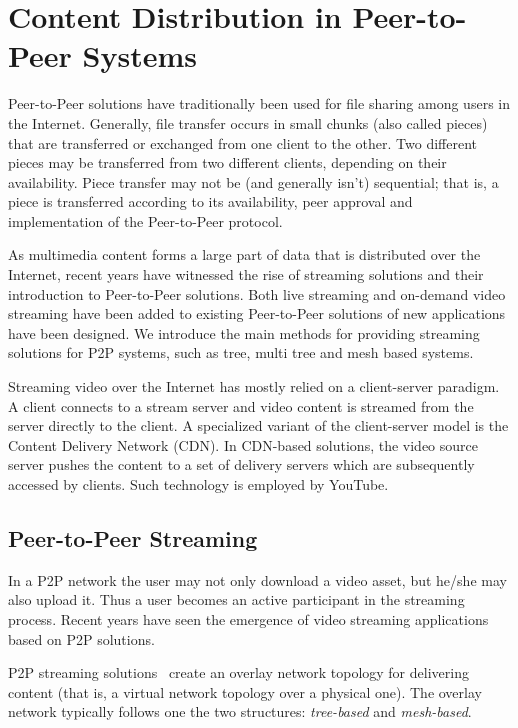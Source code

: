 \section{Content Distribution in Peer-to-Peer Systems}
\label{sec:p2p-systems:streaming}

Peer-to-Peer solutions have traditionally been used for file sharing among
users in the Internet. Generally, file transfer occurs in small chunks (also
called pieces) that are transferred or exchanged from one client to the other.
Two different pieces may be transferred from two different clients, depending
on their availability. Piece transfer may not be (and generally isn't)
sequential; that is, a piece is transferred according to its availability,
peer approval and implementation of the Peer-to-Peer protocol.

As multimedia content forms a large part of data that is distributed over the
Internet, recent years have witnessed the rise of streaming solutions and
their introduction to Peer-to-Peer solutions. Both live streaming and
on-demand video streaming have been added to existing Peer-to-Peer solutions
of new applications have been designed. We introduce the main methods for
providing streaming solutions for P2P systems, such as tree, multi tree and
mesh based systems.

Streaming video over the Internet has mostly relied on a client-server
paradigm. A client connects to a stream server and video content is streamed
from the server directly to the client. A specialized variant of the
client-server model is the Content Delivery Network (CDN). In CDN-based
solutions, the video source server pushes the content to a set of delivery
servers which are subsequently accessed by clients. Such technology is
employed by YouTube.

\subsection{Peer-to-Peer Streaming}
\label{subsec:p2p-systems:p2p-streaming-p2p}

In a P2P network the user may not only download a video asset, but he/she may
also upload it. Thus a user becomes an active participant in the streaming
process. Recent years have seen the emergence of video streaming applications
based on P2P solutions.

P2P streaming solutions~\cite{p2p-streaming-survey} create an overlay network
topology for delivering content (that is, a virtual network topology over a
physical one).  The overlay network typically follows one the two structures:
\textit{tree-based} and \textit{mesh-based}.


